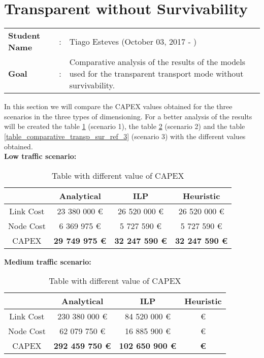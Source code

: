 \clearpage

\section{Transparent without Survivability}\label{comparative_Transp_Survivability}
\begin{tcolorbox}	
\begin{tabular}{p{2.75cm} p{0.2cm} p{10.5cm}} 	
\textbf{Student Name}  &:& Tiago Esteves    (October 03, 2017 - )\\
\textbf{Goal}          &:& Comparative analysis of the results of the models used for the transparent transport mode without survivability.
\end{tabular}
\end{tcolorbox}
\vspace{11pt}


In this section we will compare the CAPEX values obtained for the three scenarios in the three types of dimensioning. For a better analysis of the results will be created the table \ref{table_comparative_transp_sur_ref_1} (scenario 1), the table \ref{table_comparative_transp_sur_ref_2} (scenario 2) and the table \ref{table_comparative_transp_sur_ref_3} (scenario 3) with the different values obtained.\\

\textbf{Low traffic scenario:}

\begin{table}[h!]
\centering
\begin{tabular}{| c | c | c | c |}
 \hline
   & Analytical & ILP & Heuristic \\
 \hline\hline
 Link Cost & 23 380 000 \euro & 26 520 000 \euro & 26 520 000 \euro \\
 Node Cost & 6 369 975 \euro & 5 727 590 \euro & 5 727 590 \euro \\
 CAPEX & \textbf{29 749 975 \euro} & \textbf{32 247 590 \euro} & \textbf{32 247 590 \euro} \\
 \hline
\end{tabular}
\caption{Table with different value of CAPEX }
\label{table_comparative_transp_sur_ref_1}
\end{table}


\vspace{11pt}
\textbf{Medium traffic scenario:}

\begin{table}[h!]
\centering
\begin{tabular}{| c | c | c | c |}
 \hline
   & Analytical & ILP & Heuristic \\
 \hline\hline
 Link Cost & 230 380 000 \euro & 84 520 000 \euro &  \euro \\
 Node Cost & 62 079 750 \euro & 16 885 900 \euro &  \euro \\
 CAPEX & \textbf{292 459 750 \euro} & \textbf{102 650 900 \euro} & \textbf{ \euro} \\
 \hline
\end{tabular}
\caption{Table with different value of CAPEX }
\label{table_comparative_transp_sur_ref_2}
\end{table}


